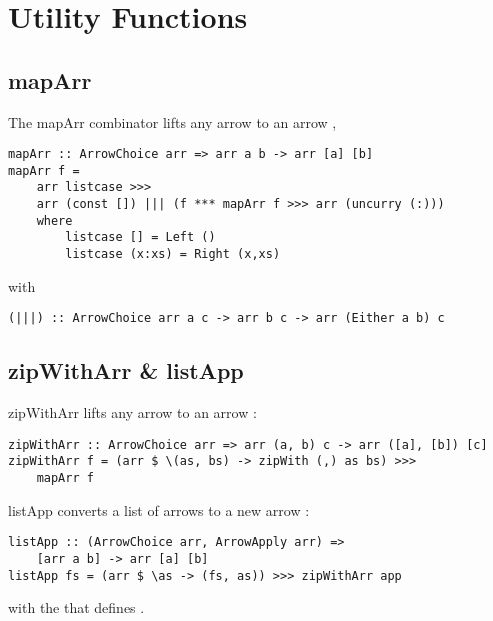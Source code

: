 \section{Utility Functions}\label{utilfns}
\subsection{mapArr}
The mapArr combinator lifts any arrow  to an arrow  \cite{programming_with_arrows},
\begin{lstlisting}[frame=htrbl]
mapArr :: ArrowChoice arr => arr a b -> arr [a] [b]
mapArr f =
	arr listcase >>>
	arr (const []) ||| (f *** mapArr f >>> arr (uncurry (:)))
	where
		listcase [] = Left ()
		listcase (x:xs) = Right (x,xs)
\end{lstlisting}
with
\begin{lstlisting}[frame=htrbl]
(|||) :: ArrowChoice arr a c -> arr b c -> arr (Either a b) c
\end{lstlisting}
\frbreak

\subsection{zipWithArr \& listApp}
zipWithArr lifts any arrow  to an arrow :
\begin{lstlisting}[frame=htrbl]
zipWithArr :: ArrowChoice arr => arr (a, b) c -> arr ([a], [b]) [c]
zipWithArr f = (arr $ \(as, bs) -> zipWith (,) as bs) >>>
	mapArr f
\end{lstlisting}
listApp converts a list of arrows \code{[arr a b]} to a new arrow :
\begin{lstlisting}[frame=htrbl]
listApp :: (ArrowChoice arr, ArrowApply arr) =>
	[arr a b] -> arr [a] [b]
listApp fs = (arr $ \as -> (fs, as)) >>> zipWithArr app
\end{lstlisting}
with the  that defines .
